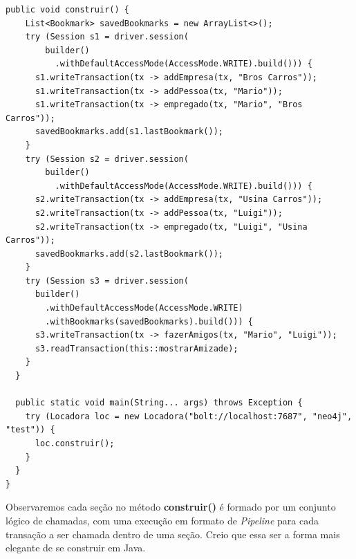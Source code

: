\begin{lstlisting}[]
  public void construir() {
    List<Bookmark> savedBookmarks = new ArrayList<>();
    try (Session s1 = driver.session(
        builder()
          .withDefaultAccessMode(AccessMode.WRITE).build())) {
      s1.writeTransaction(tx -> addEmpresa(tx, "Bros Carros"));
      s1.writeTransaction(tx -> addPessoa(tx, "Mario"));
      s1.writeTransaction(tx -> empregado(tx, "Mario", "Bros Carros"));
      savedBookmarks.add(s1.lastBookmark());
    }
    try (Session s2 = driver.session(
        builder()
          .withDefaultAccessMode(AccessMode.WRITE).build())) {
      s2.writeTransaction(tx -> addEmpresa(tx, "Usina Carros"));
      s2.writeTransaction(tx -> addPessoa(tx, "Luigi"));
      s2.writeTransaction(tx -> empregado(tx, "Luigi", "Usina Carros"));
      savedBookmarks.add(s2.lastBookmark());
    }
    try (Session s3 = driver.session(
      builder()
        .withDefaultAccessMode(AccessMode.WRITE)
        .withBookmarks(savedBookmarks).build())) {
      s3.writeTransaction(tx -> fazerAmigos(tx, "Mario", "Luigi"));
      s3.readTransaction(this::mostrarAmizade);
    }
  }

  public static void main(String... args) throws Exception {
    try (Locadora loc = new Locadora("bolt://localhost:7687", "neo4j", "test")) {
      loc.construir();
    }
  }
}
\end{lstlisting}

Observaremos cada seção no método \textbf{construir()} é formado por um conjunto lógico de chamadas, com uma execução em formato de \textit{Pipeline} para cada transação a ser chamada dentro de uma seção. Creio que essa ser a forma mais elegante de se construir em Java.